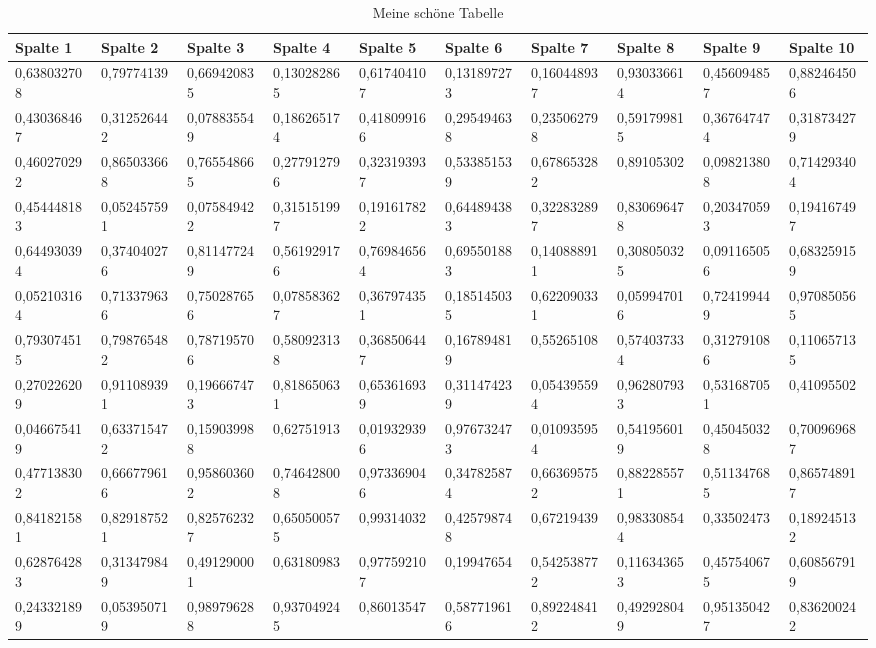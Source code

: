 \documentclass[12pt,ngerman,parskip=half]{scrartcl}
\begin{document}
\begin{table}
\caption{Meine schöne Tabelle}\label{tab:breite}
\begin{center}
\begin{tabular}{llllllllll} \toprule[2pt]
Spalte 1 	&	Spalte 2	&	Spalte 3	&	Spalte 4	&	Spalte 5	&	Spalte 6	&	Spalte 7	&	Spalte 8	&	Spalte 9	&	Spalte 10	\\ \midrule 
0,638032708	&	0,79774139	&	0,669420835	&	0,130282865	&	0,617404107	&	0,131897273	&	0,160448937	&	0,930336614	&	0,456094857	&	0,882464506	\\
0,430368467	&	0,312526442	&	0,078835549	&	0,186265174	&	0,418099166	&	0,295494638	&	0,235062798	&	0,591799815	&	0,367647474	&	0,318734279	\\
0,460270292	&	0,865033668	&	0,765548665	&	0,277912796	&	0,323193937	&	0,533851539	&	0,678653282	&	0,89105302	&	0,098213808	&	0,714293404	\\
0,454448183	&	0,052457591	&	0,075849422	&	0,315151997	&	0,191617822	&	0,644894383	&	0,322832897	&	0,830696478	&	0,203470593	&	0,194167497	\\
0,644930394	&	0,374040276	&	0,811477249	&	0,561929176	&	0,769846564	&	0,695501883	&	0,140888911	&	0,308050325	&	0,091165056	&	0,683259159	\\
0,052103164	&	0,713379636	&	0,750287656	&	0,078583627	&	0,367974351	&	0,185145035	&	0,622090331	&	0,059947016	&	0,724199449	&	0,970850565	\\
0,793074515	&	0,798765482	&	0,787195706	&	0,580923138	&	0,368506447	&	0,167894819	&	0,55265108	&	0,574037334	&	0,312791086	&	0,110657135	\\
0,270226209	&	0,911089391	&	0,196667473	&	0,818650631	&	0,653616939	&	0,311474239	&	0,054395594	&	0,962807933	&	0,531687051	&	0,41095502	\\
0,046675419	&	0,633715472	&	0,159039988	&	0,62751913	&	0,019329396	&	0,976732473	&	0,010935954	&	0,541956019	&	0,450450328	&	0,700969687	\\
0,477138302	&	0,666779616	&	0,958603602	&	0,746428008	&	0,973369046	&	0,347825874	&	0,663695752	&	0,882285571	&	0,511347685	&	0,865748917	\\
0,841821581	&	0,829187521	&	0,825762327	&	0,650500575	&	0,99314032	&	0,425798748	&	0,67219439	&	0,983308544	&	0,33502473	&	0,189245132	\\
0,628764283	&	0,313479849	&	0,491290001	&	0,63180983	&	0,977592107	&	0,19947654	&	0,542538772	&	0,116343653	&	0,457540675	&	0,608567919	\\
0,243321899	&	0,053950719	&	0,989796288	&	0,937049245	&	0,86013547	&	0,587719616	&	0,892248412	&	0,492928049	&	0,951350427	&	0,836200242	\\

\end{tabular}
\end{center}
\end{table}
\end{document}
